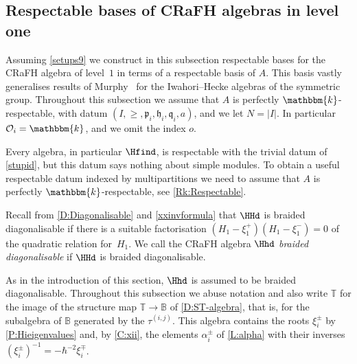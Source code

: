 \documentclass[a4paper,11pt]{amsart}
\numberwithin{equation}{subsection}
\theoremstyle{definition}
\theoremstyle{theorem}
\theoremstyle{remark}
\newcommand\CO{\mathcal{O}}
\newcommand\plam[1][\lambda]{\mathfrak{p}_{#1}}
\newcommand\hlam[1][\lambda]{\mathfrak{h}_{#1}}
\newcommand\qlam[1][\lambda]{\mathfrak{q}_{#1}}
\newcommand\Olam[1][\lambda]{\CO_{#1}}
\newcommand\xipm{\xi^\pm}
\newcommand\taui[1][i]{\tau^{(#1)}}
\newcommand\kk{\mathbbm{k}}
\newcommand\Tos{\mathbb{T}}
\newcommand{\Bo}{\mathbb{B}}
\begin{document}
\subsection{Respectable bases of CRaFH algebras in level one}
 \label{SS:LevelOneRespectable}
Assuming \autoref{setups9}  we construct in this subsection respectable bases for the CRaFH
 algebra of level~$1$ in terms of a respectable basis of $A$. This basis vastly generalises results of Murphy~\cite{Murphy:basis} for the
 Iwahori--Hecke algebras of the symmetric group.
 Throughout this subsection we assume that $A$ is perfectly $\kk$-respectable, with datum
 $(I,\ge,\plam[i],\hlam[i],\qlam[i],a)$, and we let $N=|I|$. In particular $\Olam[i]=\kk$, and we
 omit the index $o$.

\begin{Remark}
  Every algebra, in particular $\Hfind$, is respectable with the trivial
  datum of \autoref{stupid}, but this datum says nothing about simple
  modules. To obtain a useful respectable datum indexed by
  multipartitions we need to assume that $A$ is perfectly $\kk$-respectable, see
  \autoref{Rk:Respectable}.
\end{Remark}


 Recall from \autoref{D:Diagonalisable} and \autoref{xxinvformula}  that $\HHd$ is braided
 diagonalisable if there is a suitable factorisation
 $(H_1-\xi^+_1)(H_1-\xi^-_1)=0$ of the quadratic relation
 for~$H_1$. We call the CRaFH algebra $\Hhd$
 \emph{braided diagonalisable} if $\HHd$ is braided  diagonalisable.

 As in the introduction of this section, $\Hhd$ is assumed to be braided
 diagonalisable. Throughout this subsection we abuse notation and also
 write $\Tos$ for the image of the structure map $\Tos\to\Bo$ of
 \autoref{D:ST-algebra}, that is, for the subalgebra of $\Bo$ generated
 by the $\taui[i,j]$. This algebra contains the roots $\xipm_i$ by
 \autoref{P:Hieigenvalues} and,  by \autoref{C:xii}, the elements
 $\alpha^\pm_i$ of \autoref{L:alpha} with their inverses
 $(\xipm_i)^{-1}=-\hbar^{-2}\xi^\mp_i$.
\end{document}
